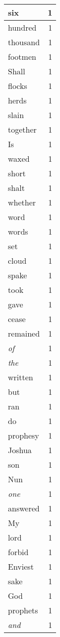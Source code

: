 \begin{center}
\begin{longtable}{l|r}
six & 1 \\ \hline
hundred & 1 \\ \hline
thousand & 1 \\ \hline
footmen & 1 \\ \hline
Shall & 1 \\ \hline
flocks & 1 \\ \hline
herds & 1 \\ \hline
slain & 1 \\ \hline
together & 1 \\ \hline
Is & 1 \\ \hline
waxed & 1 \\ \hline
short & 1 \\ \hline
shalt & 1 \\ \hline
whether & 1 \\ \hline
word & 1 \\ \hline
words & 1 \\ \hline
set & 1 \\ \hline
cloud & 1 \\ \hline
spake & 1 \\ \hline
took & 1 \\ \hline
gave & 1 \\ \hline
cease & 1 \\ \hline
remained & 1 \\ \hline
\emph{of} & 1 \\ \hline
\emph{the} & 1 \\ \hline
written & 1 \\ \hline
but & 1 \\ \hline
ran & 1 \\ \hline
do & 1 \\ \hline
prophesy & 1 \\ \hline
Joshua & 1 \\ \hline
son & 1 \\ \hline
Nun & 1 \\ \hline
\emph{one} & 1 \\ \hline
answered & 1 \\ \hline
My & 1 \\ \hline
lord & 1 \\ \hline
forbid & 1 \\ \hline
Enviest & 1 \\ \hline
sake & 1 \\ \hline
God & 1 \\ \hline
prophets & 1 \\ \hline
\emph{and} & 1 \\ \hline

\end{longtable}
\end{center}
